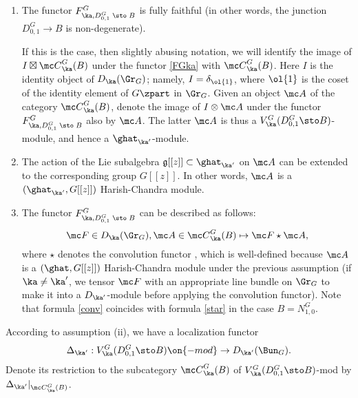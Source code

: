 \documentclass[11pt,reqno]{amsart}
\theoremstyle{plain}
\numberwithin{equation}{section}
\newcommand{\g}{\mathfrak{g}}
\theoremstyle{definition}
\begin{document}
\bigskip

\begin{enumerate}

\item The functor $F^G_{\ka,D^G_{0,1}\; \sto \; B}$ is fully faithful
  (in other words, the junction $D^G_{0,1} \to B$ is non-degenerate).

If this is the case, then slightly abusing notation, we will identify
the image of $I \boxtimes {\mc C}^G_\ka(B)$ under the functor
\eqref{FGka} with ${\mc C}^G_\ka(B)$. Here $I$ is the identity object
of $D_\ka(\Gr_G)$; namely, $I = \delta_{\ol{1}}$, where $\ol{1}$
is the coset of the identity element of $G\zpart$ in
$\Gr_G$. Given an object ${\mc A}$ of the category ${\mc
  C}^G_\ka(B)$, denote the image of $I \otimes {\mc A}$ under the
functor $F^G_{\ka,D^G_{0,1}\; \sto \; B}$ also by ${\mc A}$. The latter ${\mc
  A}$ is thus a $V^G_\ka(D^G_{0,1}\sto B)$-module, and hence a
$\ghat_{\ka'}$-module.

\bigskip

\item The action of the Lie subalgebra $\g[[z]] \subset \ghat_{\ka'}$
  on ${\mc A}$ can be extended to the corresponding group $G[[z]]$. In
  other words, ${\mc A}$ is a $(\ghat_{\ka'},G[[z]])$ Harish-Chandra
  module.

\bigskip

\item The functor $F^G_{\ka,D^G_{0,1}\; \sto \; B}$ can be described as
  follows:
\begin{equation}    \label{conv}
{\mc F} \in D_\ka(\Gr_G), {\mc A} \in {\mc C}^G_\ka(B) \mapsto
{\mc F} \star {\mc A},
\end{equation}
where $\star$ denotes the convolution functor \cite{FG}, which is
well-defined because ${\mc A}$ is a $(\ghat,G[[z]])$ Harish-Chandra
module under the previous assumption (if $\ka\neq\ka'$, we tensor
${\mc F}$ with an appropriate line bundle on $\Gr_G$ to make it into a
$D_{\ka'}$-module before applying the convolution functor). Note that
formula \eqref{conv} coincides with formula \eqref{star} in the case
$B=N^G_{1,0}$.

\end{enumerate}

\bigskip

According to assumption (ii), we have a localization functor
$$
\Delta_{\ka'}: V^G_\ka(D^G_{0,1}\sto B)\on{-mod} \to D_{\ka'}(\Bun_G).
$$
Denote its restriction to the subcategory ${\mc C}^G_\ka(B)$ of
$V^G_\ka(D^G_{0,1}\sto B)$-mod by $\Delta_{\ka'}|_{{\mc
    C}^G_\ka(B)}$.
\end{document}
